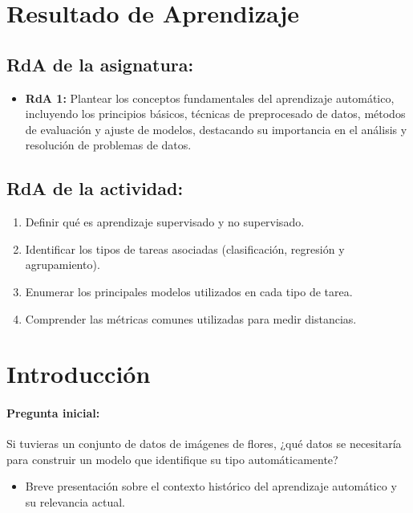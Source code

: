 \documentclass[a4,11pt]{aleph-notas}
\begin{document}
\encabezado

\section*{Resultado de Aprendizaje}

\subsection*{RdA de la asignatura:}
\begin{itemize}[leftmargin=*]
    \item \textbf{RdA 1:} 
    Plantear los conceptos fundamentales del aprendizaje automático, incluyendo los principios básicos, técnicas de preprocesado de datos, métodos de evaluación y ajuste de modelos, destacando su importancia en el análisis y resolución de problemas de datos.
\end{itemize}

\subsection*{RdA de la actividad:}
\begin{enumerate}[leftmargin=*]
    \item Definir qué es aprendizaje supervisado y no supervisado.
    \item Identificar los tipos de tareas asociadas (clasificación, regresión y agrupamiento).
    \item Enumerar los principales modelos utilizados en cada tipo de tarea.
    \item Comprender las métricas comunes utilizadas para medir distancias.
\end{enumerate}

\section*{Introducción}

\paragraph{Pregunta inicial:}  
Si tuvieras un conjunto de datos de imágenes de flores, ¿qué datos se necesitaría para construir un modelo que identifique su tipo automáticamente?

\begin{itemize}
    \item Breve presentación sobre el contexto histórico del aprendizaje automático y su relevancia actual.
\end{itemize}
\end{document}
